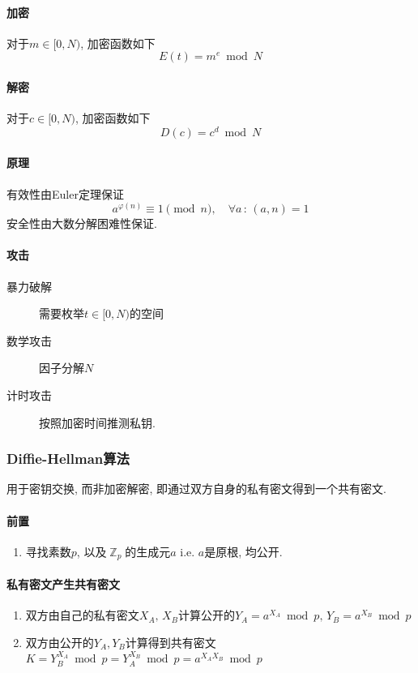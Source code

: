 \documentclass{ctexart}
\DeclareMathOperator{\Zset}{\mathbb{Z}}
\begin{document}
\paragraph{加密}
    对于$m \in [0, N)$, 加密函数如下
    \[ E(t) = m^e \bmod N \]
\paragraph{解密}
    对于$c \in [0, N)$, 加密函数如下
    \[ D(c) = c^d \bmod N \]
\paragraph{原理}
    有效性由Euler定理保证 \[ a^{\varphi(n)} \equiv 1 \pmod{n},\quad \forall a\,:\,(a, n) = 1 \]
    安全性由大数分解困难性保证.
\paragraph{攻击}
    \begin{description}
        \item[暴力破解] 需要枚举$t \in [0, N)$的空间
        \item[数学攻击] 因子分解$N$
        \item[计时攻击] 按照加密时间推测私钥.
    \end{description}
\subsubsection{Diffie-Hellman算法}
    用于密钥交换, 而非加密解密, 即通过双方自身的私有密文得到一个共有密文.
\paragraph{前置}
    \begin{enumerate}
        \item 寻找素数$p$, 以及$\Zset_p$的生成元$a$ i.e. $a$是原根, 均公开.
    \end{enumerate}
\paragraph{私有密文产生共有密文}
    \begin{enumerate}
        \item 双方由自己的私有密文$X_A,\, X_B$计算公开的$Y_A = a^{X_A} \bmod p,\, Y_B = a^{X_B} \bmod p$
        \item 双方由公开的$Y_A, Y_B$计算得到共有密文$K = Y_B^{X_A} \bmod p = Y_A^{X_B} \bmod p = a^{X_A X_B} \bmod p$
    \end{enumerate}
\end{document}
